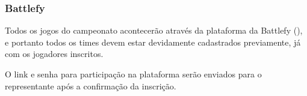 \subsubsection{Battlefy}

Todos os jogos do campeonato acontecerão através da plataforma da Battlefy (), e portanto todos os times devem estar devidamente cadastrados previamente, já com os jogadores inscritos.

O link e senha para participação na plataforma serão enviados para o representante após a confirmação da inscrição.